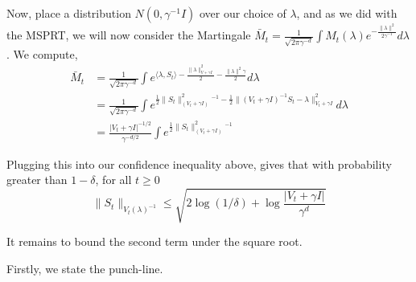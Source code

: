 Now, place a distribution $N(0, \gamma^{-1}I)$ over our choice of $\lambda$, and as we did with the MSPRT, we will now consider the Martingale $\bar{M}_t = \frac{1}{\sqrt{2\pi\gamma^{-d}}}\int M_t(\lambda) e^{-\frac{\|\lambda\|^2}{2\gamma^{-1}}} d\lambda$. We compute,
\begin{align*}
    \bar{M}_t 
    &= \frac{1}{\sqrt{2\pi\gamma^{-d}}}\int  e^{\langle\lambda, S_t\rangle -\frac{\|\lambda\|_{V + \gamma I}^2}{2}-\frac{\|\lambda\|^2\gamma}{2}} d\lambda\\
    &= \frac{1}{\sqrt{2\pi\gamma^{-d}}}\int e^{\frac{1}{2}\|S_t\|^2_(V_t + \gamma I)^{-1} - \frac{1}{2}\|(V_t + \gamma I)^{-1} S_t - \lambda\|^2_{V_t + \gamma I}} d\lambda\\
    &= \frac{|V_t + \gamma I|^{-1/2}}{\gamma^{-d/2}}\int e^{\frac{1}{2}\|S_t\|^2_(V_t +\gamma I )^{-1}} 
\end{align*}

Plugging this into our confidence inequality above, gives that with probability greater than $1-\delta$, for all $t\geq 0$
\[\|S_t\|_{V_t(\lambda)^{-1}} \leq \sqrt{2\log(1/\delta) + \log{\frac{|V_t + \gamma I|}{\gamma^d}}}\]

It remains to bound the second term under the square root. 



Firstly, we state the punch-line.




